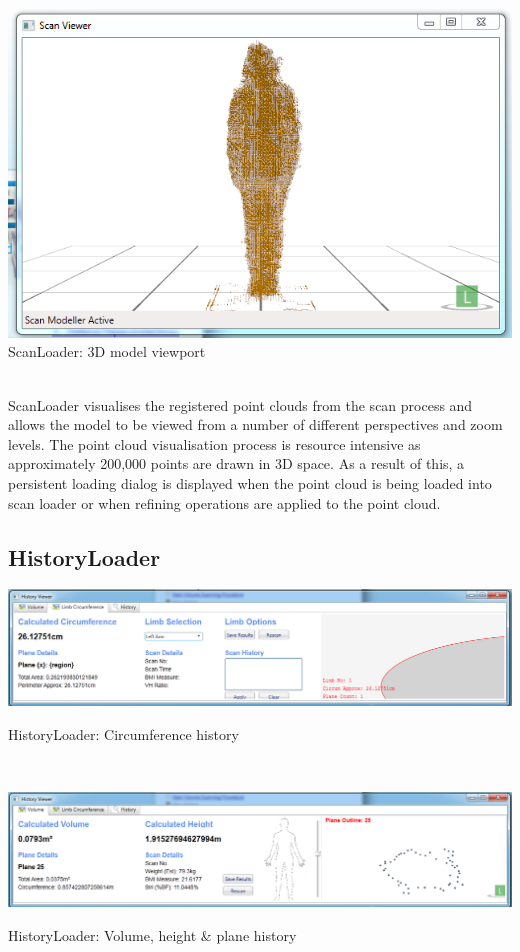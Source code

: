 \begin{center}
    \includegraphics[scale=0.5]{zscreenshots/scanframework.png} \\
    \caption{ScanLoader: 3D model viewport}
\end{center} \\

ScanLoader visualises the registered point clouds from the scan process and allows the model to be viewed from a number of different perspectives and zoom levels. The point cloud visualisation process is resource intensive as approximately 200,000 points are drawn in 3D space. As a result of this, a persistent loading dialog is displayed when the point cloud is being loaded into scan loader or when refining operations are applied to the point cloud. \\

\subsection{HistoryLoader}

\begin{center}
    \includegraphics[scale=0.4]{zscreenshots/circumdetail.png}
    \caption{HistoryLoader: Circumference history}
\end{center} \\

\begin{center}
    \includegraphics[scale=0.4]{zscreenshots/voldetail.png}
    \caption{HistoryLoader: Volume, height \& plane history}
\end{center} \\

